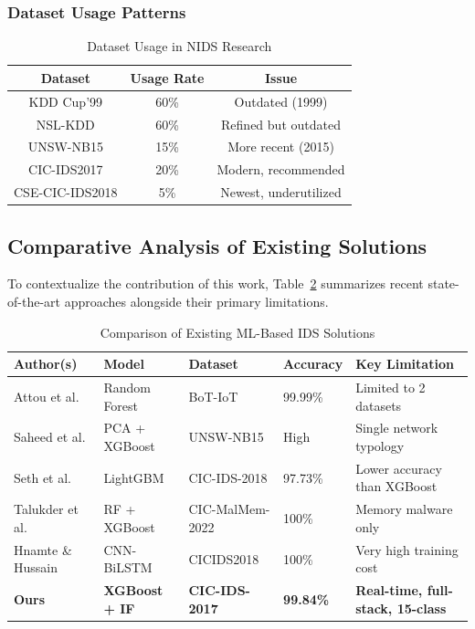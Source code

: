 \documentclass[12pt,a4paper]{article}
\begin{document}
\subsubsection{Dataset Usage Patterns}

\begin{table}[H]
\centering
\caption{Dataset Usage in NIDS Research}
\label{tab:dataset_usage}
\begin{tabular}{|c|c|c|}
\hline
\textbf{Dataset} & \textbf{Usage Rate} & \textbf{Issue} \\
\hline
KDD Cup'99 & 60\% & Outdated (1999) \\
NSL-KDD & 60\% & Refined but outdated \\
UNSW-NB15 & 15\% & More recent (2015) \\
CIC-IDS2017 & 20\% & Modern, recommended \\
CSE-CIC-IDS2018 & 5\% & Newest, underutilized \\
\hline
\end{tabular}
\end{table}

\subsection{Comparative Analysis of Existing Solutions}

To contextualize the contribution of this work, Table~\ref{tab:lit_comparison} summarizes recent state-of-the-art approaches alongside their primary limitations.

\begin{table}[H]
\centering
\caption{Comparison of Existing ML-Based IDS Solutions}
\label{tab:lit_comparison}
\begin{tabular}{|p{2.8cm}|p{2.2cm}|p{2.2cm}|p{2.2cm}|p{3.5cm}|}
\hline
\textbf{Author(s)} & \textbf{Model} & \textbf{Dataset} & \textbf{Accuracy} & \textbf{Key Limitation} \\
\hline
Attou et al. \cite{attou2023cloud} & Random Forest & BoT-IoT & 99.99\% & Limited to 2 datasets \\
Saheed et al. \cite{saheed2022machine} & PCA + XGBoost & UNSW-NB15 & High & Single network typology \\
Seth et al. \cite{seth2021novel} & LightGBM & CIC-IDS-2018 & 97.73\% & Lower accuracy than XGBoost \\
Talukder et al. \cite{talukder2023dependable} & RF + XGBoost & CIC-MalMem-2022 & 100\% & Memory malware only \\
Hnamte \& Hussain \cite{hnamte2023dcnnbilstm} & CNN-BiLSTM & CICIDS2018 & 100\% & Very high training cost \\
\hline
\textbf{Ours} & \textbf{XGBoost + IF} & \textbf{CIC-IDS-2017} & \textbf{99.84\%} & \textbf{Real-time, full-stack, 15-class} \\
\hline
\end{tabular}
\end{table}
\end{document}
